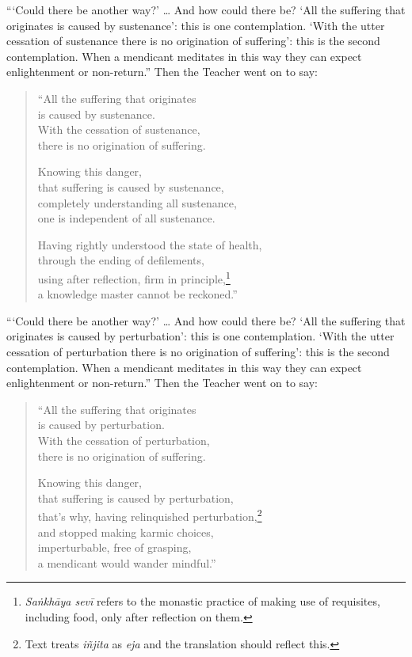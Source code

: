 \documentclass[12pt,openany]{book}%
\begin{document}
“‘Could there be another way?’ … And how could there be? ‘All the suffering that originates is caused by sustenance’: this is one contemplation. ‘With the utter cessation of sustenance there is no origination of suffering’: this is the second contemplation. When a mendicant meditates in this way they can expect enlightenment or non-return.” Then the Teacher went on to say: 

\begin{verse}%
“All the suffering that originates \\
is caused by sustenance. \\
With the cessation of sustenance, \\
there is no origination of suffering. 

Knowing this danger, \\
that suffering is caused by sustenance, \\
completely understanding all sustenance, \\
one is independent of all sustenance. 

Having rightly understood the state of health, \\
through the ending of defilements, \\
using after reflection, firm in principle,\footnote{\textit{\textsanskrit{Saṅkhāya} \textsanskrit{sevī}} refers to the monastic practice of making use of requisites, including food, only after reflection on them. } \\
a knowledge master cannot be reckoned.” 

%
\end{verse}

“‘Could there be another way?’ … And how could there be? ‘All the suffering that originates is caused by perturbation’: this is one contemplation. ‘With the utter cessation of perturbation there is no origination of suffering’: this is the second contemplation. When a mendicant meditates in this way they can expect enlightenment or non-return.” Then the Teacher went on to say: 

\begin{verse}%
“All the suffering that originates \\
is caused by perturbation. \\
With the cessation of perturbation, \\
there is no origination of suffering. 

Knowing this danger, \\
that suffering is caused by perturbation, \\
that’s why, having relinquished perturbation,\footnote{Text treats \textit{\textsanskrit{iñjita}} as \textit{eja} and the translation should reflect this. } \\
and stopped making karmic choices, \\
imperturbable, free of grasping, \\
a mendicant would wander mindful.” 

%
\end{verse}
\end{document}
